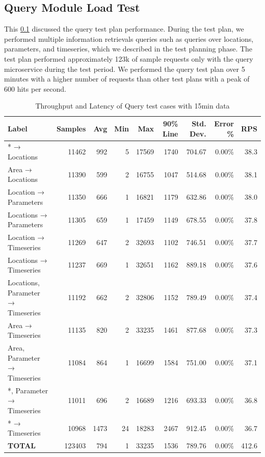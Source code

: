 \subsection{Query Module Load Test}
\label{subse:obs_test_plan_query_15min}

This \cref{subse:obs_test_plan_query_15min} discussed the query test plan performance. During the test plan, we performed multiple information retrievals queries such as queries over locations, parameters, and timeseries, which we described in the test planning phase. The test plan performed approximately 123k of sample requests only with the query microservice during the test period. We performed the query test plan over 5 minutes with a higher number of requests than other test plans with a peak of 600 hits per second.

\begin{table}[ht]
\caption{Throughput and Latency of Query test cases with 15min data}
\footnotesize
\begin{tabulary}{\linewidth}{|L|R|R|R|R|R|R|R|R|}
\hline
Label & Samples & Avg & Min & Max & 90\% Line & Std. Dev. & Error \% & RPS \\ \hline
* → Locations & 11462 & 992 & 5 & 17569 & 1740 & 704.67 & 0.00\% & 38.3 \\ \hline
Area → Locations & 11390 & 599 & 2 & 16755 & 1047 & 514.68 & 0.00\% & 38.1 \\ \hline
Location → Parameters & 11350 & 666 & 1 & 16821 & 1179 & 632.86 & 0.00\% & 38.0 \\ \hline
Locations → Parameters & 11305 & 659 & 1 & 17459 & 1149 & 678.55 & 0.00\% & 37.8 \\ \hline
Location → Timeseries & 11269 & 647 & 2 & 32693 & 1102 & 746.51 & 0.00\% & 37.7 \\ \hline
Locations → Timeseries & 11237 & 669 & 1 & 32651 & 1162 & 889.18 & 0.00\% & 37.6 \\ \hline
Locations, Parameter → Timeseries & 11192 & 662 & 2 & 32806 & 1152 & 789.49 & 0.00\% & 37.4 \\ \hline
Area → Timeseries & 11135 & 820 & 2 & 33235 & 1461 & 877.68 & 0.00\% & 37.3 \\ \hline
Area, Parameter → Timeseries & 11084 & 864 & 1 & 16699 & 1584 & 751.00 & 0.00\% & 37.1 \\ \hline
*, Parameter → Timeseries & 11011 & 696 & 2 & 16689 & 1216 & 693.33 & 0.00\% & 36.8 \\ \hline
* → Timeseries & 10968 & 1473 & 24 & 18283 & 2467 & 912.45 & 0.00\% & 36.7 \\ \hline
\textbf{TOTAL} & 123403 & 794 & 1 & 33235 & 1536 & 789.76 & 0.00\% & 412.6 \\ \hline
\end{tabulary}
\label{tab:obs_query_15_min_summary}
\end{table}

